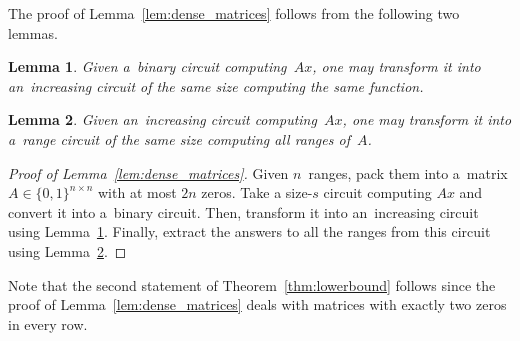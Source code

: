 \documentclass[11pt,letterpaper]{article}
\newtheorem{lemma}{Lemma}
\newtheorem{corollary}{Corollary}
\begin{document}
The proof of Lemma~\ref{lem:dense_matrices} follows from the following two lemmas.

\begin{lemma}\label{lemma:correctorder}
Given a~binary circuit computing~$Ax$, one may transform it into an~increasing circuit of the same size computing the same function.
\end{lemma}

\begin{lemma}\label{lemma:matrixranges}
Given an~increasing circuit computing~$Ax$, one may transform it into a~range circuit of the same size computing all ranges of~$A$.
\end{lemma}

\begin{proof}[Proof of Lemma~\ref{lem:dense_matrices}]
Given $n$~ranges, pack them into a~matrix $A \in \{0,1\}^{n \times n}$ with at most $2n$ zeros. Take a size-$s$ circuit computing $Ax$ and convert it into a~binary circuit. Then, transform it into an~increasing circuit using Lemma~\ref{lemma:correctorder}. Finally, extract the answers to all the ranges from this circuit using Lemma~\ref{lemma:matrixranges}.
\end{proof}

Note that the second statement of Theorem~\ref{thm:lowerbound} follows since the proof of Lemma~\ref{lem:dense_matrices} deals with matrices with exactly two zeros in every row.
\end{document}
